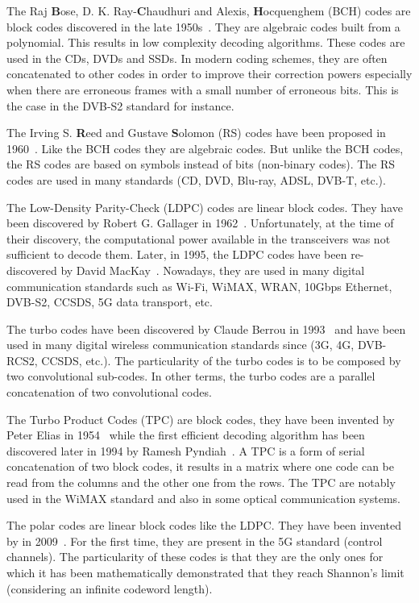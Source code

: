 The Raj \textbf{B}ose, D. K. Ray-\textbf{C}haudhuri and Alexis,
\textbf{H}ocquenghem (BCH) codes are block codes discovered in the late
1950s~\cite{Hocquenghem1959,Bose1960}. They are algebraic codes built from a
polynomial. This results in low complexity decoding algorithms. These codes are
used in the CDs, DVDs and SSDs. In modern coding schemes, they are often
concatenated to other codes in order to improve their correction powers
especially when there are erroneous frames with a small number of erroneous
bits. This is the case in the DVB-S2 standard for instance.

The Irving S. \textbf{R}eed and Gustave \textbf{S}olomon (RS) codes have been
proposed in 1960~\cite{Reed1960}. Like the BCH codes they are algebraic codes.
But unlike the BCH codes, the RS codes are based on symbols instead of bits
(non-binary codes). The RS codes are used in many standards (CD, DVD, Blu-ray,
ADSL, DVB-T, etc.). %

The Low-Density Parity-Check (LDPC) codes are linear block codes. They have been
discovered by Robert G. Gallager in 1962~\cite{Gallager1962}. Unfortunately, at
the time of their discovery, the computational power available in the
transceivers was not sufficient to decode them. Later, in 1995, the LDPC codes
have been re-discovered by David MacKay~\cite{MacKay1995}. Nowadays, they are
used in many digital communication standards such as Wi-Fi, WiMAX, WRAN, 10Gbps
Ethernet, DVB-S2, CCSDS, 5G data transport, etc.

The turbo codes have been discovered by Claude Berrou in 1993~\cite{Berrou1993}
and have been used in many digital wireless communication standards since (3G,
4G, DVB-RCS2, CCSDS, etc.). The particularity of the turbo codes is to be
composed by two convolutional sub-codes. In other terms, the turbo codes are a
parallel concatenation of two convolutional codes.

The Turbo Product Codes (TPC) are block codes, they have been invented by Peter
Elias in 1954~\cite{Elias1954} while the first efficient decoding algorithm has
been discovered later in 1994 by Ramesh Pyndiah~\cite{Pyndiah1994}. A TPC is a
form of serial concatenation of two block codes, it results in a matrix where
one code can be read from the columns and the other one from the rows. The TPC
are notably used in the WiMAX standard and also in some optical communication
systems.

The polar codes are linear block codes like the LDPC. They have been invented
by \Arikan in 2009~\cite{Arikan2009}. For the first time, they are present in
the 5G standard (control channels). The particularity of these codes is that
they are the only ones for which it has been mathematically demonstrated that
they reach Shannon's limit (considering an infinite codeword length).

